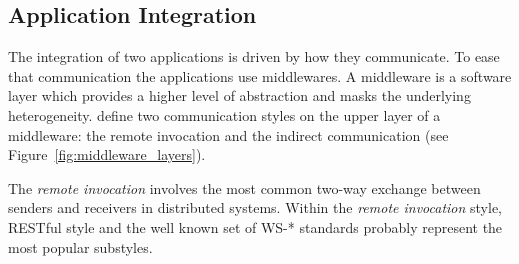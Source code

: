 \subsection{Application Integration}
\label{sec:soa_integration}

%
%


The integration of two applications is driven by how they communicate.
To ease that communication the applications use middlewares.
A middleware is a software layer which provides a higher level of abstraction and masks the underlying heterogeneity.
\citet{coulouris_distributed_2012} define two communication styles on the upper layer of a middleware: %
the remote invocation and the indirect communication (see Figure~\ref{fig:middleware_layers}).



The \emph{remote invocation} involves the most common two-way exchange between senders and receivers in distributed systems.
Within the \emph{remote invocation} style, RESTful style \citep{fielding_architectural_2000} and the well known set of WS-* \citep{alonso_web_2010} standards probably represent the most popular substyles.


\medskip



